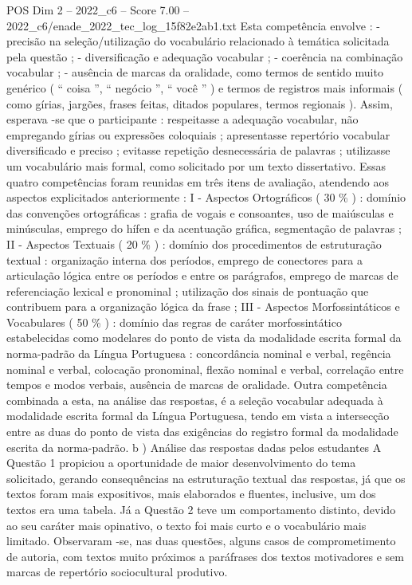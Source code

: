 \begin{textsample}{POS Dim 2 – 2022\_c6 – Score 7.00 – 2022\_c6/enade\_2022\_tec\_log\_15f82e2ab1.txt}
Esta competência envolve : - precisão na seleção/utilização do vocabulário relacionado à temática solicitada pela questão ; - diversificação e adequação vocabular ; - coerência na combinação vocabular ; - ausência de marcas da oralidade, como termos de sentido muito genérico ( “ coisa ”, “ negócio ”, “ você ” ) e termos de registros mais informais ( como gírias, jargões, frases feitas, ditados populares, termos regionais ).
Assim, esperava -se que o participante : respeitasse a adequação vocabular, não empregando gírias ou expressões coloquiais ; apresentasse repertório vocabular diversificado e preciso ; evitasse repetição desnecessária de palavras ; utilizasse um vocabulário mais formal, como solicitado por um texto dissertativo.
Essas quatro competências foram reunidas em três itens de avaliação, atendendo aos aspectos explicitados anteriormente : I - Aspectos Ortográficos ( 30 \% ) : domínio das convenções ortográficas : grafia de vogais e consoantes, uso de maiúsculas e minúsculas, emprego do hífen e da acentuação gráfica, segmentação de palavras ; II - Aspectos Textuais ( 20 \% ) : domínio dos procedimentos de estruturação textual : organização interna dos períodos, emprego de conectores para a articulação lógica entre os períodos e entre os parágrafos, emprego de marcas de referenciação lexical e pronominal ; utilização dos sinais de pontuação que contribuem para a organização lógica da frase ; III - Aspectos Morfossintáticos e Vocabulares ( 50 \% ) : domínio das regras de caráter morfossintático estabelecidas como modelares do ponto de vista da modalidade escrita formal da norma-padrão da Língua Portuguesa : concordância nominal e verbal, regência nominal e verbal, colocação pronominal, flexão nominal e verbal, correlação entre tempos e modos verbais, ausência de marcas de oralidade.
Outra competência combinada a esta, na análise das respostas, é a seleção vocabular adequada à modalidade escrita formal da Língua Portuguesa, tendo em vista a intersecção entre as duas do ponto de vista das exigências do registro formal da modalidade escrita da norma-padrão. b ) Análise das respostas dadas pelos estudantes A Questão 1 propiciou a oportunidade de maior desenvolvimento do tema solicitado, gerando consequências na estruturação textual das respostas, já que os textos foram mais expositivos, mais elaborados e fluentes, inclusive, um dos textos era uma tabela.
Já a Questão 2 teve um comportamento distinto, devido ao seu caráter mais opinativo, o texto foi mais curto e o vocabulário mais limitado.
Observaram -se, nas duas questões, alguns casos de comprometimento de autoria, com textos muito próximos a paráfrases dos textos motivadores e sem marcas de repertório sociocultural produtivo.

\end{textsample}
